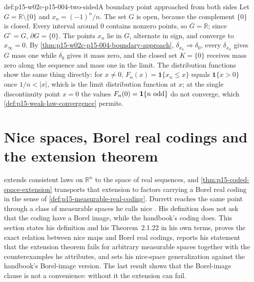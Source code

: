 \begin{hbexample}{def:p15-w02c-p15-004-two-sided}{A boundary point approached from both sides}
Let \(G=\mathbb R\setminus\{0\}\) and \(x_n=(-1)^n/n\). The set \(G\)
is open, because the complement \(\{0\}\) is closed. Every interval
around \(0\) contains nonzero points, so \(\overline G=\mathbb R\);
since \(G^\circ=G\), \(\partial G=\{0\}\). The points \(x_n\) lie in
\(G\), alternate in sign, and converge to \(x_\infty=0\). By
\cref{thm:p15-w02c-p15-004-boundary-approach},
\(\delta_{x_n}\Rightarrow\delta_0\), every \(\delta_{x_n}\) gives
\(G\) mass one while \(\delta_0\) gives it mass zero, and the closed set
\(K=\{0\}\) receives mass zero along the sequence and mass one in the
limit. The distribution functions show the same thing directly: for
\(x\neq0\), \(F_n(x)=\mathbf1\{x_n\leq x\}\) equals \(\mathbf1\{x>0\}\)
once \(1/n<|x|\), which is the limit distribution function at \(x\);
at the single discontinuity point \(x=0\) the values
\(F_n(0)=\mathbf1\{n\hbox{ odd}\}\) do not converge, which
\cref{def:p15-weak-law-convergence} permits.
\end{hbexample}

\section{Nice spaces, Borel real codings and the extension theorem}
\label{sec:p15-w02c-p15-004-nice}

 extends consistent laws on
\(\mathbb R^n\) to the space of real sequences, and
\cref{thm:p15-coded-space-extension} transports that extension to
factors carrying a Borel real coding in the sense of
\cref{def:p15-measurable-real-coding}. Durrett reaches the same point
through a class of measurable spaces he calls nice
\cite[p.~53]{DurrettPTEAuthor2019}. His definition does not ask that
the coding have a Borel image, while the handbook's coding does. This
section states his definition and his Theorem~2.1.22 in his own terms,
proves the exact relation between nice maps and Borel real codings,
reports his statement that the extension theorem fails for arbitrary
measurable spaces together with the counterexamples he attributes, and
sets his nice-space generalization against the handbook's Borel-image
version. The last result shows that the Borel-image clause is not a
convenience: without it the extension can fail.

